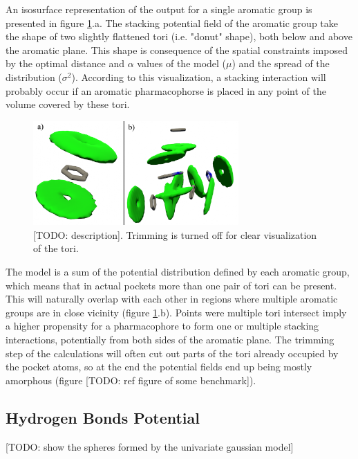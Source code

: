       An isosurface representation of the output for a single aromatic group is presented in figure \ref{fig:results/visualize_stacking}.a. The stacking potential field of the aromatic group take the shape of two slightly flattened tori (i.e. "donut" shape), both below and above the aromatic plane. This shape is consequence of the spatial constraints imposed by the optimal distance and $\alpha$ values of the model ($\mu$) and the spread of the distribution ($\sigma^2$). According to this visualization, a stacking interaction will probably occur if an aromatic pharmacophorse is placed in any point of the volume covered by these tori.

      \begin{figure}[H]
        \centering
        \includegraphics[width=0.7\textwidth]{figures/results/visualize_stacking.png}
        \caption{\label{fig:results/visualize_stacking} [TODO: description]. Trimming is turned off for clear visualization of the tori.}
      \end{figure}

      The model is a sum of the potential distribution defined by each aromatic group, which means that in actual pockets more than one pair of tori can be present. This will naturally overlap with each other in regions where multiple aromatic groups are in close vicinity (figure \ref{fig:results/visualize_stacking}.b). Points were multiple tori intersect imply a higher propensity for a pharmacophore to form one or multiple stacking interactions, potentially from both sides of the aromatic plane. The trimming step of the calculations will often cut out parts of the tori already occupied by the pocket atoms, so at the end the potential fields end up being mostly amorphous (figure [TODO: ref figure of some benchmark]).

  \subsection{Hydrogen Bonds Potential}
    [TODO: show the spheres formed by the univariate gaussian model]

